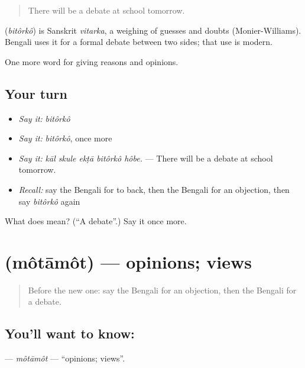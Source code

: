 \begin{quote}
There will be a debate at school tomorrow.
\end{quote}

\begin{cousinweb}
\textbf{} (\emph{bitôrkô}) is Sanskrit \emph{vitarka}, a weighing of guesses and doubts (Monier-Williams). Bengali uses it for a formal debate between two sides; that use is modern.
\end{cousinweb}

\begin{grammarlens}[title={What you've built}]
One more word for giving reasons and opinions.
\end{grammarlens}

\subsection*{Your turn}
\begin{itemize}
\raggedright
  \item \emph{Say it:} \emph{bitôrkô}
  \item \emph{Say it:} \emph{bitôrkô}, once more
  \item \emph{Say it:} \emph{kāl skule ekṭā bitôrkô hôbe.} — There will be a debate at school tomorrow.
  \item \emph{Recall:} say the Bengali for to back, then the Bengali for an objection, then say \emph{bitôrkô} again
\end{itemize}

\begin{tcolorbox}[breakable,colback=teal!4,colframe=teal!35!black,title={Before you move on}]
What does  mean? (\textquotedblleft{}A debate\textquotedblright{}.) Say it once more.
\end{tcolorbox}
\section[\texorpdfstring{\bn{মতামত} (môtāmôt)}{মতামত (môtāmôt)}]{ (môtāmôt) — opinions; views}

\label{lesson:BN-C334-motamot}



\begin{quote}
Before the new one: say the Bengali for an objection, then the Bengali for a debate.
\end{quote}

\subsection*{You'll want to know: }
\textbf{} — \emph{môtāmôt} — \textquotedblleft{}opinions; views\textquotedblright{}.

